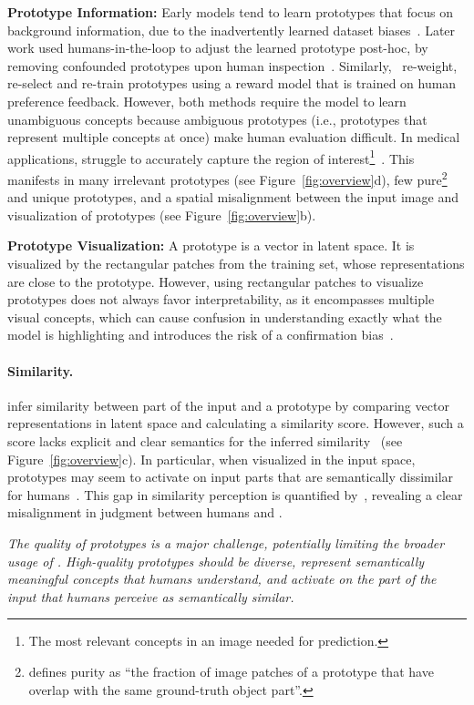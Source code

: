 \textbf{Prototype Information:} 
Early models tend to learn prototypes that focus on background information, due to the inadvertently learned dataset biases~\citep{Chen_2019_ThisLooksThat,Nauta_2021_NeuralPrototypeTrees}.
Later work used humans-in-the-loop to adjust the learned prototype post-hoc, by removing confounded prototypes upon human inspection~\citep{Bontempelli_2023_ConceptlevelDebuggingPartPrototype}. 
Similarly,~\citet{Li_2024_ImprovingPrototypicalVisual} re-weight, re-select and re-train prototypes using a reward model that is trained on human preference feedback. However, both methods require the model to learn unambiguous concepts because ambiguous prototypes (i.e., prototypes that represent multiple concepts at once) make human evaluation difficult. 
In medical applications, \ppms struggle to accurately capture the region of interest\footnote{The most relevant concepts in an image needed for prediction.}~\citep{Pathak_2024_PrototypebasedInterpretableBreast}. This manifests in many irrelevant prototypes (see Figure~\ref{fig:overview}d), few pure\footnote{\citet{Nauta_2023_PIPNetPatchBasedIntuitive} defines purity as ``the fraction of image patches of a prototype that have overlap with the same ground-truth object part''.} and unique prototypes, and a spatial misalignment between the input image and visualization of prototypes (see Figure~\ref{fig:overview}b).

\textbf{Prototype Visualization:} 
A prototype is a vector in latent space. It is visualized by the rectangular patches from the training set, whose representations are close to the prototype. However, using rectangular patches to visualize prototypes does not always favor interpretability, 
as it encompasses multiple visual concepts, which can cause confusion in understanding exactly what the model is highlighting and introduces the risk of a confirmation bias~\cite{Alpherts2024_facct_perceptive-visual-urban-analytics}.

\paragraph{\texorpdfstring{\colorbox[RGB]{191, 239, 239}{Similarity}}{Similarity}.}
\label{ssssec:chall:proto:quality:sim}
\ppms infer similarity between part of the input and a prototype by comparing vector representations in latent space and calculating a similarity score. However, such a score lacks explicit and clear semantics for the inferred similarity~\citep{Hong_2023_ProtoryNetInterpretableText} (see Figure~\ref{fig:overview}c).
In particular, when visualized in the input space, prototypes may seem to activate on input parts that are semantically dissimilar for humans~\citep{Donnelly_2022_DeformableProtoPNetInterpretable,Hong_2023_ProtoryNetInterpretableText}. This gap in similarity perception is quantified by~\citet{Kim_2022_HIVEEvaluatingHuman}, revealing a clear misalignment in judgment between humans and \ppms.


\textit{The quality of prototypes is a major challenge, potentially limiting the broader usage of \ppms. High-quality prototypes should be diverse, represent semantically meaningful concepts that humans understand, and activate on the part of the input that humans perceive as semantically similar.}
